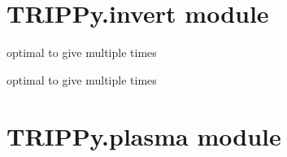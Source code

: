 \documentclass[letterpaper,10pt,english]{sphinxmanual}
\begin{document}
\chapter{TRIPPy.invert module}
\label{TRIPPy:module-TRIPPy.invert}\label{TRIPPy:trippy-invert-module}

\begin{fulllineitems}
\label{TRIPPy:TRIPPy.invert.rhosens}
optimal to give multiple times

\end{fulllineitems}


\begin{fulllineitems}
\label{TRIPPy:TRIPPy.invert.sens}
optimal to give multiple times

\end{fulllineitems}



\chapter{TRIPPy.plasma module}
\label{TRIPPy:module-TRIPPy.plasma}\label{TRIPPy:trippy-plasma-module}
\end{document}
